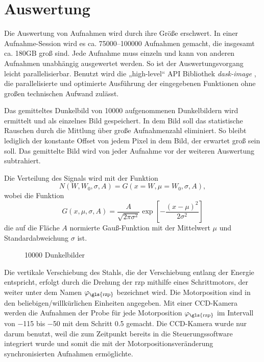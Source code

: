 \chapter{Auswertung}
\label{text:auswertung}
Die Auswertung von Aufnahmen wird durch ihre Größe erschwert. In einer Aufnahme-Session wird es ca. \numrange{75000}{100000} Aufnahmen gemacht, die insgesamt ca. 180GB groß sind. Jede Aufnahme muss einzeln und kann von anderen Aufnahmen unabhängig ausgewertet werden. So ist der Auswertungsvorgang leicht parallelisierbar. Benutzt wird die „high-level“ API Bibliothek \textit{dask-image} \cite{dask-library}, die parallelisierte und optimierte Ausführung der eingegebenen Funktionen ohne großen technischen Aufwand zulässt.

\noindent
Das gemitteltes Dunkelbild von \num{10000} aufgenommenen Dunkelbildern wird ermittelt und als einzelnes Bild gespeichert. In dem Bild soll das statistische Rauschen durch die Mittlung über große Aufnahmenzahl eliminiert. So bleibt lediglich der konstante Offset von jedem Pixel in dem Bild, der erwartet groß sein soll. Das gemittelte Bild wird von jeder Aufnahme vor der weiteren Auswertung subtrahiert.

\noindent
Die Verteilung des Signals wird mit der Funktion
\begin{equation}
    N(W, W_0, \sigma, A) = G(x=W,\mu=W_0,\sigma, A),
\end{equation}
wobei die Funktion
\begin{equation}
    G(x, \mu, \sigma, A) = \frac{A}{\sqrt{2\pi \sigma^2}}\exp\left[-\frac{(x - \mu)^2}{2\sigma^2}\right]
    \label{eq:gauss_funktion}
\end{equation}
die auf die Fläche $A$ normierte Gauß-Funktion mit der Mittelwert $\mu$ und Standardabweichung $\sigma$ ist.

\noindent
\begin{figure}[H]
    \centering
    
    \caption{\num{10000} Dunkelbilder}
    \label{fig:noise_hist_fit}
\end{figure}
\noindent
Die vertikale Verschiebung des Stahls, die der Verschiebung entlang der Energie entspricht, erfolgt durch die Drehung der \gls{rzp} mithilfe eines Schrittmotors, der weiter unter dem Namen $\varphi_\text{\gls{rzp}}$ bezeichnet wird. Die Motorposition sind in den beliebigen/willkürlichen Einheiten angegeben. Mit einer CCD-Kamera werden die Aufnahmen der Probe für jede Motorposition $\varphi_\text{\gls{rzp}}$ im Intervall von  \num{-115} bis \num{-50} mit dem Schritt \num{0,5} gemacht. Die CCD-Kamera wurde nur darum benutzt, weil die zum Zeitpunkt bereits in die Steuerungssoftware integriert wurde und somit die mit der Motorpositionsveränderung synchronisierten Aufnahmen ermöglichte.

